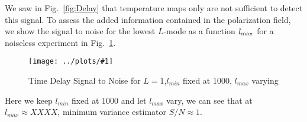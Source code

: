 \documentclass[prl,amsmath,amssymb,floatfix,superscriptaddress,nofootinbib,twocolumn]{revtex4-1}
\newcommand{\sfig}[2]{
\texttt{[image: ../plots/\#1]}
        }
\newcommand{\Spng}[2]{
   \begin{figure}[thbp]
   \begin{center}
    \sfig{#1.png}{\columnwidth}
    \caption{{\small #2}}
    \label{fig:#1}
     \end{center}
   \end{figure}
}
\newcommand{\rf}[1]{\ref{fig:#1}}
\begin{document}
We saw in Fig.~\rf{Delay} that temperature maps only are not sufficient to detect this signal. To assess the added information contained in the polarization field, we show the signal to noise for the lowest $L$-mode as a function $l_{\rm max}$ for a noiseless experiment in Fig.~\rf{StoN}.
\Spng{StoN}{Time Delay Signal to Noise for $L=1$,$l_{min}$ fixed at $1000$, $l_{max}$ varying}
Here we keep $l_{min}$ fixed at $1000$ and let $l_{max}$ vary, we can see that at $l_{max} \approx XXXX$, minimum variance estimator $S/N \approx 1$. 
\end{document}
